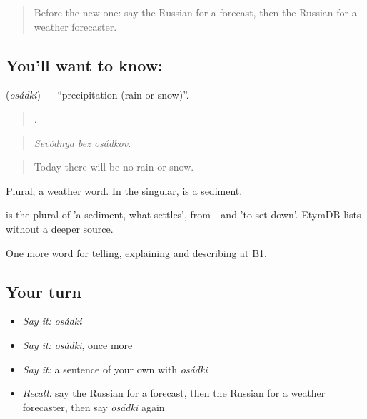\label{lesson:RU-C464-osadki}



\begin{quote}
Before the new one: say the Russian for a forecast, then the Russian for a weather forecaster.
\end{quote}

\subsection*{You'll want to know: }
\textbf{} (\emph{osádki}) — \textquotedblleft{}precipitation (rain or snow)\textquotedblright{}.

\begin{quote}
  .
\end{quote}

\begin{quote}
\emph{Sevódnya bez osádkov.}
\end{quote}

\begin{quote}
Today there will be no rain or snow.
\end{quote}

Plural; a weather word. In the singular, \emph{} is a sediment.

\begin{cousinweb}
\emph{} is the plural of \emph{} 'a sediment, what settles', from \emph{-} and \emph{} 'to set down'. EtymDB lists \emph{} without a deeper source.
\end{cousinweb}

\begin{grammarlens}[title={What you've built}]
One more word for telling, explaining and describing at B1.
\end{grammarlens}

\subsection*{Your turn}
\begin{itemize}
\raggedright
  \item \emph{Say it:} \emph{osádki}
  \item \emph{Say it:} \emph{osádki}, once more
  \item \emph{Say it:} a sentence of your own with \emph{osádki}
  \item \emph{Recall:} say the Russian for a forecast, then the Russian for a weather forecaster, then say \emph{osádki} again
\end{itemize}

